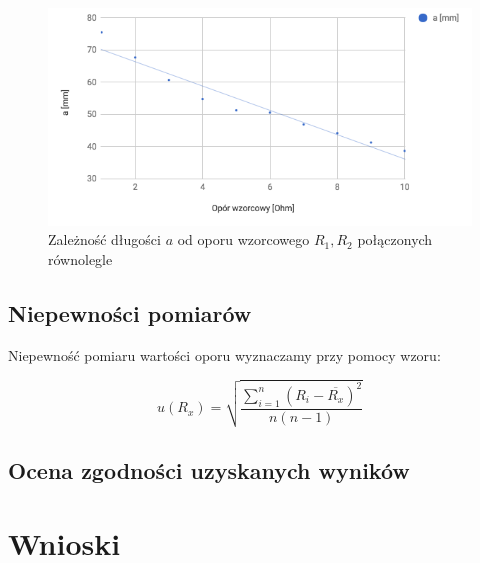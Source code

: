 \documentclass[a4paper,10pt,twoside]{article}
\begin{document}
\begin{figure}[!htp]
\centerline{\includegraphics[scale=0.5]{wykres_r1_r2_par.png}}
\caption{Zależność długości $a$ od oporu wzorcowego $R_1, R_2$ połączonych równolegle}
\label{fig:wykres_r1_r2_par}
\end{figure}


\subsection{Niepewności pomiarów}

Niepewność pomiaru wartości oporu wyznaczamy przy pomocy wzoru:

$$ u(R_x) = \sqrt{\frac{\sum^n_{i=1}\left(R_i - \overline{R_x} \right)^2}{n(n-1)}} $$

\subsection{Ocena zgodności uzyskanych wyników}

\section{Wnioski}
\end{document}
